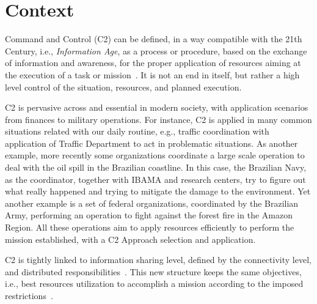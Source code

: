 \section{Context} \label{sec:context}



Command and Control (C2) can be defined, in a way compatible with the 21th Century, i.e., \textit{Information Age}, as a process or procedure, based on the exchange of information and awareness, for the proper application of resources aiming at the execution of a task or mission~\cite{Power01}. It is not an end in itself, but rather a high level control of the situation, resources, and planned execution. 

C2 is pervasive across and essential in modern society, with  application scenarios from finances to military operations. For instance, C2 is applied in many common situations related with our daily routine, e.g., traffic coordination with application of Traffic Department to act in problematic situations. As another example, more recently some organizations coordinate a large scale operation to deal with the oil spill in the Brazilian coastline. In this case, the Brazilian Navy, as the coordinator, together with \gls{IBAMA} and research centers, try to figure out what really happened and trying to mitigate the damage to the environment. Yet another example is a set of federal organizations, coordinated by the Brazilian Army, performing an operation to fight against the forest fire in the Amazon Region. All these operations aim to apply resources efficiently to perform the mission established, with a C2 Approach selection and application.   

C2 is tightly linked to information sharing level, defined by the connectivity level, and distributed responsibilities~\cite{Power01}. This new structure keeps the same objectives, i.e., best resources utilization to accomplish a mission according to the imposed restrictions~\cite{c2_01}.

